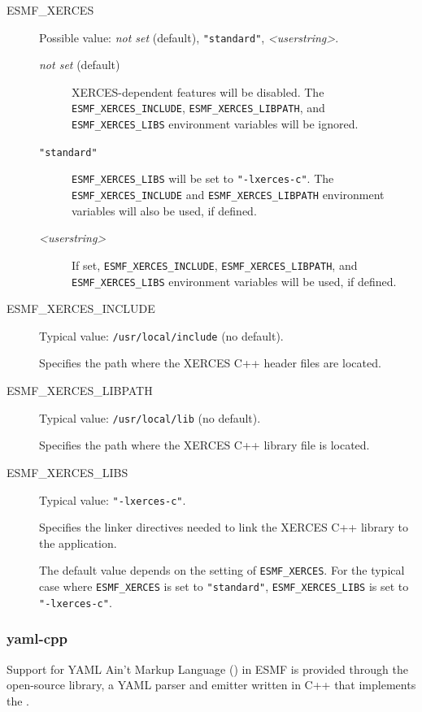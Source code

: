 \begin{description}

\item[ESMF\_XERCES] Possible value: {\it not set} (default), {\tt "standard"},
{\it <userstring>}.

\begin{description}
\item[{\it not set} (default)] XERCES-dependent features will be disabled.
The {\tt ESMF\_XERCES\_INCLUDE}, {\tt ESMF\_XERCES\_LIBPATH}, and
{\tt ESMF\_XERCES\_LIBS} environment variables will be ignored.

\item[{\tt "standard"}] {\tt ESMF\_XERCES\_LIBS} will be set to
{\tt "-lxerces-c"}.  The {\tt ESMF\_XERCES\_INCLUDE} and
{\tt ESMF\_XERCES\_LIBPATH} environment variables will also be used,
if defined.

\item[{\it <userstring>}] If set, {\tt ESMF\_XERCES\_INCLUDE},
{\tt ESMF\_XERCES\_LIBPATH}, and {\tt ESMF\_XERCES\_LIBS} environment
variables will be used, if defined.
\end{description}

\item[ESMF\_XERCES\_INCLUDE] Typical value: {\tt /usr/local/include}
(no default).

Specifies the path where the XERCES C++ header files are located.

\item[ESMF\_XERCES\_LIBPATH] Typical value: {\tt /usr/local/lib} (no default).

Specifies the path where the XERCES C++ library file is located.

\item[ESMF\_XERCES\_LIBS] Typical value: {\tt "-lxerces-c"}.

Specifies the linker directives needed to link the XERCES C++ library to
the application.

The default value depends on the setting of {\tt ESMF\_XERCES}.  For the
typical case where {\tt ESMF\_XERCES} is set to {\tt "standard"},
{\tt ESMF\_XERCES\_LIBS} is set to {\tt "-lxerces-c"}.
\end{description}


\subsubsection{yaml-cpp}
\label{sec:yaml-cpp}
Support for YAML Ain't Markup Language
()
in ESMF is provided through the open-source
 library,
a YAML parser and emitter written in C++ that implements the
.

